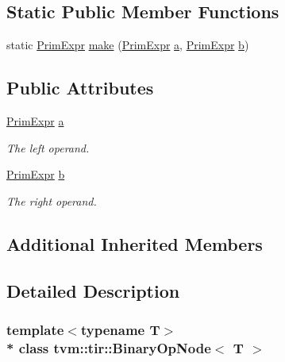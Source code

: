 \subsection*{Static Public Member Functions}
\begin{DoxyCompactItemize}
\item 
static \hyperlink{classtvm_1_1PrimExpr}{Prim\+Expr} \hyperlink{classtvm_1_1tir_1_1BinaryOpNode_afb3a9f4de76865880cc9f19ebcc75ea0}{make} (\hyperlink{classtvm_1_1PrimExpr}{Prim\+Expr} \hyperlink{classtvm_1_1tir_1_1BinaryOpNode_adbbd197d65ab43acfc1ffdfd0f2b75ab}{a}, \hyperlink{classtvm_1_1PrimExpr}{Prim\+Expr} \hyperlink{classtvm_1_1tir_1_1BinaryOpNode_a2b8c5fdbb2edc200484b7195ad68acf6}{b})
\end{DoxyCompactItemize}
\subsection*{Public Attributes}
\begin{DoxyCompactItemize}
\item 
\hyperlink{classtvm_1_1PrimExpr}{Prim\+Expr} \hyperlink{classtvm_1_1tir_1_1BinaryOpNode_adbbd197d65ab43acfc1ffdfd0f2b75ab}{a}
\begin{DoxyCompactList}\small\item\em The left operand. \end{DoxyCompactList}\item 
\hyperlink{classtvm_1_1PrimExpr}{Prim\+Expr} \hyperlink{classtvm_1_1tir_1_1BinaryOpNode_a2b8c5fdbb2edc200484b7195ad68acf6}{b}
\begin{DoxyCompactList}\small\item\em The right operand. \end{DoxyCompactList}\end{DoxyCompactItemize}
\subsection*{Additional Inherited Members}


\subsection{Detailed Description}
\subsubsection*{template$<$typename T$>$\\*
class tvm\+::tir\+::\+Binary\+Op\+Node$<$ T $>$}

